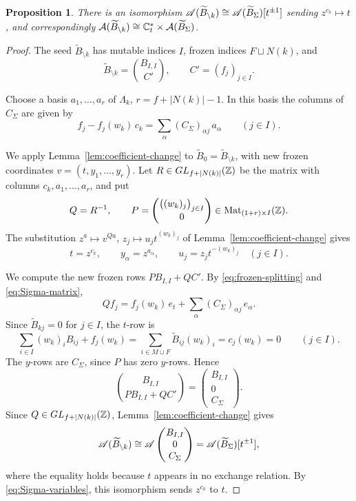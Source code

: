 \documentclass[12pt, letter]{amsart}
\newtheorem{proposition}[dummy]{Proposition}
\theoremstyle{definition}
\begin{document}
\begin{proposition}
\label{prop:splitting_ABprime}
There is an isomorphism 
$\mathscr{A}(\widetilde B_{\setminus k})\cong\mathscr{A}(\widetilde B_\Sigma)[t^{\pm1}]$ sending $z^{c_k}\mapsto t$, and correspondingly 
$\mathcal{A}(\widetilde B_{\setminus k}) \cong \mathbb{C}^*_t \times \mathcal{A}(\widetilde{B}_\Sigma)$. 
\end{proposition}

\begin{proof}
The seed $\widetilde B_{\setminus k}$ has mutable indices $I$, frozen indices $F\sqcup N(k)$, and
\[
 \widetilde B_{\setminus k}=\binom{B_{I,I}}{C'},\qquad C'=(f_j)_{j\in I}.
\]

Choose a basis $a_1,\dots,a_r$ of $\Lambda_k$, $r=f+|N(k)|-1$.
In this basis the columns of $C_\Sigma$ are given by
\begin{equation}\label{eq:Sigma-matrix}
 f_j-f_j(w_k)\,c_k=\sum_\alpha(C_\Sigma)_{\alpha j}\,a_\alpha\qquad(j\in I).
\end{equation}

We apply Lemma~\ref{lem:coefficient-change} to $\widetilde B_0=\widetilde B_{\setminus k}$, with new frozen coordinates $v=(t,y_1,\dots,y_r)$.
Let $R\in GL_{f+|N(k)|}(\mathbb{Z})$ be the matrix with columns $c_k,a_1,\dots,a_r$, and put
\[
 Q=R^{-1},\qquad
 P=\begin{pmatrix}\bigl((w_k)_j\bigr)_{j\in I}\\ 0\end{pmatrix}\in\operatorname{Mat}_{(1+r)\times I}(\mathbb{Z}).
\]
The substitution $z^a\mapsto v^{Qa}$, $z_j\mapsto u_jt^{(w_k)_j}$ of Lemma~\ref{lem:coefficient-change} gives
\begin{equation}\label{eq:Sigma-variables}
 t=z^{c_k},\qquad y_\alpha=z^{a_\alpha},\qquad u_j=z_jt^{-(w_k)_j}\quad(j\in I).
\end{equation}

We compute the new frozen rows $PB_{I,I}+QC'$.
By \eqref{eq:frozen-splitting} and \eqref{eq:Sigma-matrix},
\[
 Qf_j=f_j(w_k)\,e_t+\sum_\alpha(C_\Sigma)_{\alpha j}\,e_\alpha .
\]
Since $\widetilde B_{kj}=0$ for $j\in I$, the $t$-row is
\[
 \sum_{i\in I}(w_k)_iB_{ij}+f_j(w_k)=\sum_{i\in M\sqcup F}\widetilde B_{ij}(w_k)_i=c_j(w_k)=0\qquad(j\in I).
\]
The $y$-rows are $C_\Sigma$, since $P$ has zero $y$-rows.
Hence
\[
 \binom{B_{I,I}}{PB_{I,I}+QC'}=\begin{pmatrix}B_{I,I}\\0\\C_\Sigma\end{pmatrix}.
\]
Since $Q\in GL_{f+|N(k)|}(\mathbb{Z})$, Lemma~\ref{lem:coefficient-change} gives
\[
 \mathscr{A}(\widetilde B_{\setminus k})\cong\mathscr{A}\begin{pmatrix}B_{I,I}\\0\\C_\Sigma\end{pmatrix}=\mathscr{A}(\widetilde B_\Sigma)[t^{\pm1}],
\]
where the equality holds because $t$ appears in no exchange relation.
By \eqref{eq:Sigma-variables}, this isomorphism sends $z^{c_k}$ to $t$.
\end{proof}
\end{document}

